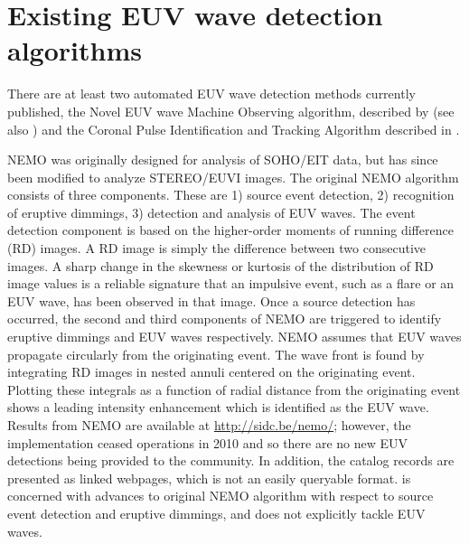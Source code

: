 \section{Existing EUV wave detection algorithms}\label{sec:existing}

There are at least two automated EUV wave detection methods currently
published, the Novel EUV wave Machine Observing algorithm, described
by \cite{2005SoPh..228..265P} (see also
\cite{2012SoPh..276..479P}) and the Coronal Pulse Identification and
Tracking Algorithm described in \cite{2014SoPh..289.3279L}.

NEMO was originally designed for analysis of SOHO/EIT data, but has
since been modified to analyze STEREO/EUVI images. The original NEMO
algorithm \cite{2005SoPh..228..265P} consists of three
components. These are 1) source event detection, 2) recognition of
eruptive dimmings, 3) detection and analysis of EUV waves. The event
detection component is based on the higher-order moments of running
difference (RD) images. A RD image is simply the difference between
two consecutive images. A sharp change in the skewness or kurtosis of
the distribution of RD image values is a reliable signature that an
impulsive event, such as a flare or an EUV wave, has been observed in
that image. Once a source detection has occurred, the second and third
components of NEMO are triggered to identify eruptive dimmings and EUV
waves respectively.  NEMO assumes that EUV waves propagate circularly
from the originating event. The wave front is found by integrating RD
images in nested annuli centered on the originating event.  Plotting
these integrals as a function of radial distance from the originating
event shows a leading intensity enhancement which is identified as the
EUV wave.  Results from NEMO are available at
\url{http://sidc.be/nemo/}; however, the implementation ceased
operations in 2010 and so there are no new EUV detections being
provided to the community.  In addition, the catalog records are
presented as linked webpages, which is not an easily queryable format.
\cite{2012SoPh..276..479P} is concerned with advances to original NEMO
algorithm with respect to source event detection and eruptive
dimmings, and does not explicitly tackle EUV waves.

